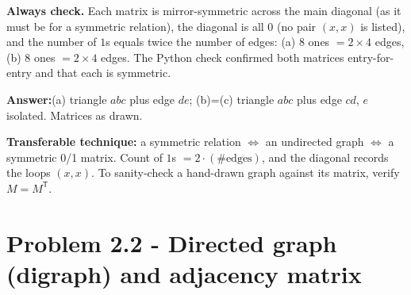 \documentclass[11pt,a4paper]{article}
\newcommand{\answer}[1]{\begin{answerbox}\centering\textbf{Answer:}\quad #1\end{answerbox}}
\begin{document}
\begin{center}
\end{center}

\textbf{Always check.} Each matrix is mirror-symmetric across the main diagonal (as it must be for a
symmetric relation), the diagonal is all $0$ (no pair $(x,x)$ is listed), and the number of $1$s
equals twice the number of edges: (a) $8$ ones $=2\times4$ edges, (b) $8$ ones $=2\times4$ edges.
The Python check confirmed both matrices entry-for-entry and that each is symmetric. \checkmark

\answer{(a) triangle $abc$ plus edge $de$; (b)=(c) triangle $abc$ plus edge $cd$, $e$ isolated. Matrices as drawn.}

\begin{methodbox}
\textbf{Transferable technique:} a symmetric relation $\Leftrightarrow$ an undirected graph
$\Leftrightarrow$ a symmetric 0/1 matrix. Count of $1$s $=2\cdot(\#\text{edges})$, and the diagonal
records the loops $(x,x)$. To sanity-check a hand-drawn graph against its matrix, verify $M=M^{\mathsf T}$.
\end{methodbox}

\section*{Problem 2.2 - Directed graph (digraph) and adjacency matrix}
\end{document}
